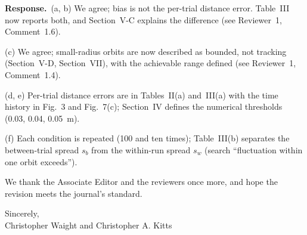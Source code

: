 \documentclass[10pt]{article}
\newcommand{\rev}[1]{#1}                             %
\newcommand{\resp}{\par\textbf{Response.}~}
\begin{document}
\resp (a, b) We agree; bias is not the per-trial distance error. Table~III now reports both, and Section~V-C explains the difference (see Reviewer~1, Comment~1.6).

(c) We agree; small-radius orbits are now described as bounded, not tracking (Section~V-D, Section~VII), with the achievable range defined (see Reviewer~1, Comment~1.4).

(d, e) Per-trial distance errors are in Tables~II(a) and~III(a) with the time history in Fig.~3 and \rev{Fig.~7(c)}; Section~IV defines the numerical thresholds (0.03, 0.04, 0.05~m).

(f) Each condition is repeated (\rev{100} and \rev{ten} times); Table~III(b) separates the between-trial spread $s_b$ from the within-run spread $s_w$ (search ``fluctuation within one orbit exceeds'').

\vspace{6pt}
We thank the Associate Editor and the reviewers once more, and hope the revision meets the journal's standard.

Sincerely,\\
Christopher Waight and Christopher A. Kitts
\end{document}
